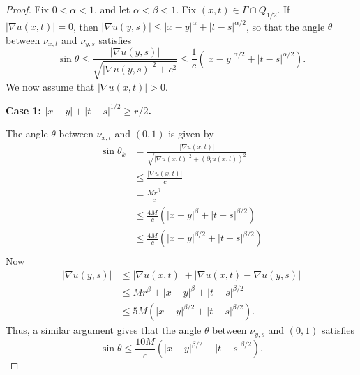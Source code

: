 \documentclass{amsart}
\numberwithin{equation}{section}
\begin{document}
\begin{proof}
    Fix $0<\alpha<1$, and let $\alpha<\beta<1$. Fix $(x,t) \in \Gamma \cap Q_{1/2}$. If $|\nabla u(x,t)|=0$, then 
    $|\nabla u(y,s)|\leq |x-y|^{\alpha}+|t-s|^{\alpha/2}$, so that the angle $\theta$ between $\nu_{x,t}$ and $\nu_{y,s}$ satisfies
    \[
    \sin \theta \leq \frac{|\nabla u(y,s)|}{\sqrt{|\nabla u(y,s)|^2 + c^2}}
    \leq \frac{1}{c} (|x-y|^{\alpha/2}+|t-s|^{\alpha/2}). 
    \]
    We now assume that $|\nabla u(x,t)|>0$. 
    
   \noindent  \textbf{Case 1: $|x-y|+|t-s|^{1/2}\geq r/2$.}

     The angle $\theta$ between $\nu_{x,t}$ and $(0,1)$ is given by 
    \[
     \begin{aligned}
     \sin \theta_k&=\frac{|\nabla u(x,t)|}{\sqrt{|\nabla u(x,t)|^2 + (\partial_t u(x,t))^2}} \\
    &\leq \frac{|\nabla u(x,t)|}{c} \\
    &= \frac{Mr^{\beta}}{c}\\
    &\leq \frac{4M}{c}\left(|x - y|^{\beta}+|t-s|^{\beta/2} \right)\\
    &\leq \frac{4M}{c}\left(|x - y|^{\beta/2}+|t-s|^{\beta/2} \right) \\
    \end{aligned}
    \]
    Now
    \[
    \begin{aligned}
    |\nabla u(y,s)|&\leq |\nabla u(x,t)|+|\nabla u(x,t)-\nabla u(y,s)| \\
    &\leq Mr^{\beta} + |x-y|^{\beta}+ |t-s|^{\beta/2}\\
    &\leq 5M(|x-y|^{\beta/2}+ |t-s|^{\beta/2}).
    \end{aligned}
    \]
    Thus, a similar argument gives that the angle $\theta$ between $\nu_{y,s}$ and $(0,1)$ satisfies
    \[
    \sin \theta \leq \frac{10M}{c}\left(|x - y|^{\beta/2}+|t-s|^{\beta/2} \right).
    \]



\end{proof}
\end{document}
